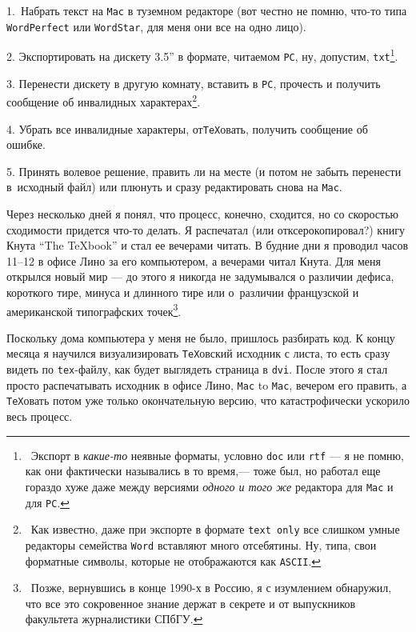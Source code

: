 \documentclass[intlimits,twoside,a4paper,11pt]{article}
\begin{document}
	1.~Набрать текст на {\tt Mac} в туземном редакторе (вот честно не помню, что-то
	типа {\tt WordPerfect} или {\tt WordStar}, для меня они все на одно лицо).
	
	2. Экспортировать на дискету 3.5'' в формате, читаемом {\tt PC}, ну, допустим, 
	{\tt txt}\footnote{~Экспорт в {\it какие-то\/} неявные форматы, условно {\tt doc} 
		или {\tt rtf} --- я не помню, как они фактически назывались в то время,---
		тоже был, но работал еще гораздо хуже даже между версиями {\it одного и того же\/} 
		редактора для {\tt Mac} и для {\tt PC}.}.
	
	3. Перенести дискету в другую комнату, вставить в {\tt PC}, прочесть и получить 
	сообщение об инвалидных характерах\footnote{~Как известно, даже при экспорте в 
		формате {\tt text only} все слишком умные редакторы семейства {\tt Word} вставляют 
		много отсебятины. Ну, типа, свои форматные символы, которые не отображаются 
		как {\tt ASCII}.}. 
	
	4. Убрать все инвалидные характеры, от{\tt \TeX}овать, получить 
	сообщение об ошибке. 
	
	5. Принять волевое решение, править ли на месте (и потом
	не забыть перенести в~исходный файл) или плюнуть и сразу редактировать снова
	на {\tt Mac}. 
	\par
	Через несколько дней я понял, что процесс, конечно, сходится, но со скоростью
	сходимости придется что-то делать. Я распечатал (или отксерокопировал?) книгу Кнута
	``The {\TeX}book'' и стал ее вечерами читать. В будние дни я проводил часов
	11--12 в офисе Лино за его компьютером, а вечерами читал Кнута. Для меня
	открылся новый мир --- до этого я никогда не задумывался о различии дефиса,
	короткого тире, минуса и длинного тире или о~различии французской и 
	американской типографских точек\footnote{~Позже, вернувшись в конце 
		1990-х в Россию, я с изумлением обнаружил, что все это сокровенное знание
		держат в секрете и от выпускников факультета журналистики СПбГУ.}.
	
	Поскольку дома компьютера у меня не было, пришлось разбирать код. 
	К концу месяца я научился визуализировать {\tt TeX}овский исходник с листа, 
	то есть сразу видеть по {\tt tex}-файлу, как будет выглядеть страница в {\tt dvi}. 
	После этого я стал просто 
	распечатывать исходник в офисе Лино, {\tt Mac} to {\tt Mac}, вечером его 
	править, а {\tt TeX}овать потом уже только окончательную версию, что 
	катастрофически ускорило весь процесс.
	
\end{document}
